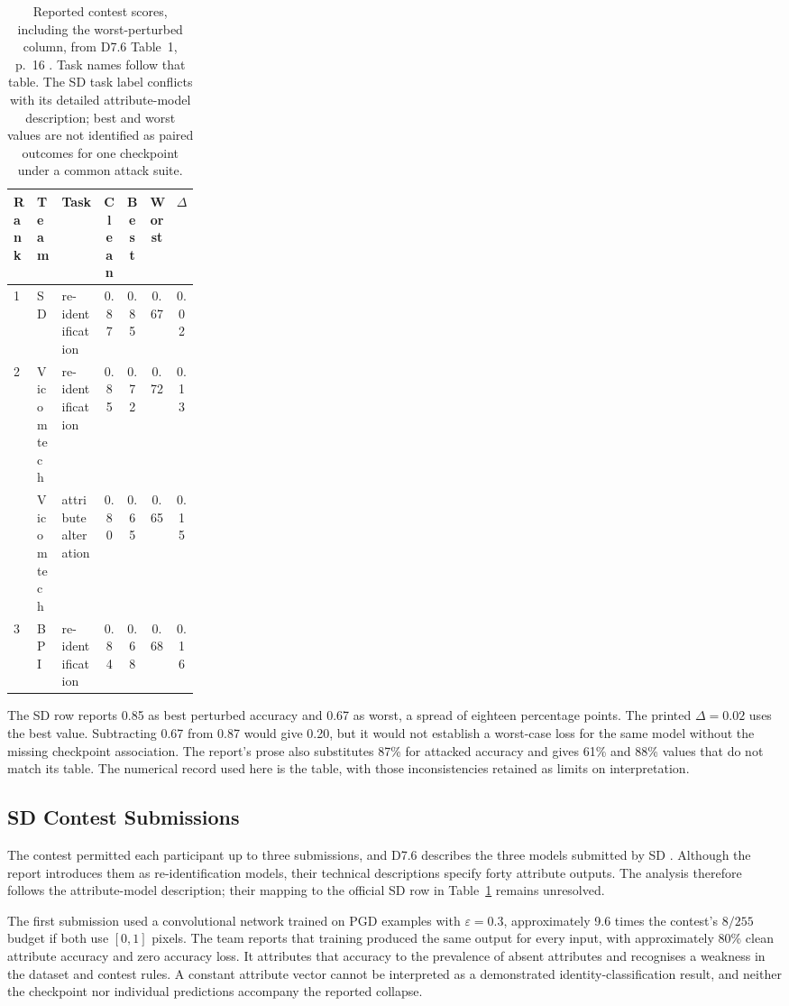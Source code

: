\begin{table}[tbp]
  \caption{Reported contest scores, including the worst-perturbed column, from D7.6 Table~1,
    p.~16 \cite{sparta2022d76}. Task names follow that table. The SD task label conflicts
    with its detailed attribute-model description; best and worst values are not identified
    as paired outcomes for one checkpoint under a common attack suite.}
  \label{tab:advml:contest}
  \centering\small
  \begin{tabular}{@{}llp{0.24\linewidth}cccc@{}}
    \toprule
    Rank & Team & Task & Clean & Best & Worst & $\Delta$ \\
    \midrule
    1 & SD & re-identification & 0.87 & 0.85 & 0.67 & 0.02 \\
    2 & Vicomtech & re-identification & 0.85 & 0.72 & 0.72 & 0.13 \\
      & Vicomtech & attribute alteration & 0.80 & 0.65 & 0.65 & 0.15 \\
    3 & BPI & re-identification & 0.84 & 0.68 & 0.68 & 0.16 \\
    \bottomrule
  \end{tabular}
\end{table}

The SD row reports 0.85 as best perturbed accuracy and 0.67 as worst, a spread of eighteen
percentage points. The printed $\Delta=0.02$ uses the best value. Subtracting 0.67 from 0.87
would give 0.20, but it would not establish a worst-case loss for the same model without the
missing checkpoint association. The report's prose also substitutes 87\% for attacked
accuracy and gives 61\% and 88\% values that do not match its table. The numerical record
used here is the table, with those inconsistencies retained as limits on interpretation.

\subsection{SD Contest Submissions}
\label{sec:advml:8:sd}

The contest permitted each participant up to three submissions, and D7.6 describes the three
models submitted by SD \cite{sparta2021d73,sparta2022d76}. Although the report introduces
them as re-identification models, their technical descriptions specify forty attribute outputs.
The analysis therefore follows the attribute-model description; their mapping to the official
SD row in Table~\ref{tab:advml:contest} remains unresolved.

The first submission used a convolutional network trained on PGD examples with
$\varepsilon=0.3$, approximately 9.6 times the contest's $8/255$ budget if both use
$[0,1]$ pixels. The team reports that training produced the same output for every input,
with approximately 80\% clean attribute accuracy and zero accuracy loss. It attributes that
accuracy to the prevalence of absent attributes and recognises a weakness in the dataset
and contest rules. A constant attribute vector cannot be interpreted as a demonstrated
identity-classification result, and neither the checkpoint nor individual predictions
accompany the reported collapse.

